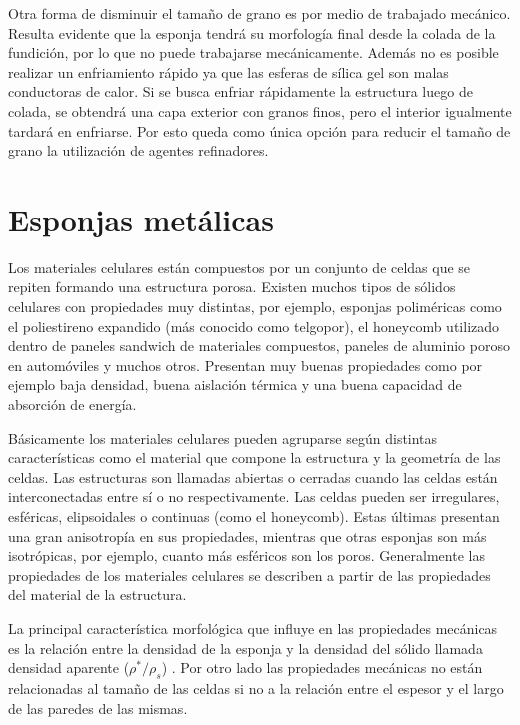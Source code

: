 \documentclass[a4paper,12pt,fleqn,twoside,openany]{book}
\begin{document}
Otra forma de disminuir el tamaño de grano es por medio de trabajado mecánico. Resulta evidente que la esponja tendrá su morfología final desde la colada de la 
fundición, por lo que no puede trabajarse mecánicamente. Además no es posible realizar un enfriamiento rápido ya que las esferas de sílica gel son malas conductoras de 
calor. Si se busca enfriar rápidamente la estructura luego de colada, se obtendrá una capa exterior con granos finos, pero el interior igualmente tardará en 
enfriarse. Por esto queda como única opción para reducir el tamaño de grano la utilización de agentes refinadores.


\section{Esponjas metálicas}

Los materiales celulares están compuestos por un conjunto de celdas que se repiten formando una estructura porosa. Existen muchos tipos de sólidos celulares 
con propiedades muy distintas, por ejemplo, esponjas poliméricas como el poliestireno expandido (más conocido como telgopor), el honeycomb utilizado dentro 
de paneles sandwich de materiales compuestos, paneles de aluminio poroso en automóviles y muchos otros. Presentan muy buenas propiedades como por ejemplo 
baja densidad, buena aislación térmica y una buena capacidad de absorción de energía.

Básicamente los materiales celulares pueden agruparse según distintas características como el material que compone la estructura y la geometría de las 
celdas. Las estructuras son llamadas abiertas o cerradas cuando las celdas están interconectadas entre sí o no respectivamente. Las celdas pueden ser irregulares, esféricas, elipsoidales o continuas (como el honeycomb). Estas últimas presentan una gran anisotropía en sus propiedades, mientras que otras 
esponjas son más isotrópicas, por ejemplo, cuanto más esféricos son los poros. Generalmente las propiedades de los materiales celulares se describen a partir de las 
propiedades del material de la estructura. 

La principal característica morfológica que influye en las propiedades mecánicas es la relación entre la densidad de la esponja y la densidad 
del sólido llamada densidad aparente ($\rho^* / \rho_s$) \cite{cellular}. Por otro lado las propiedades mecánicas no están relacionadas al tamaño 
de las celdas si no a la relación entre el espesor y el largo de las paredes de las mismas.  
\end{document}
